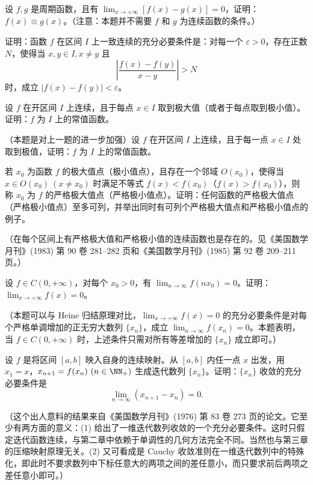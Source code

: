 \begin{xreferenceproblem}[14]
设 $f,g$ 是周期函数，且有 $\lim_{x\to+\infty}[f(x)-g(x)]=0$，证明：$f(x)\equiv g(x)$。（注意：本题并不需要 $f$ 和 $g$ 为连续函数的条件。）
\end{xreferenceproblem}

\begin{xreferenceproblem}[15]
证明：函数 $f$ 在区间 $I$ 上一致连续的充分必要条件是：对每一个 $\varepsilon>0$，存在正数 $N$，使得当 $x,y\in I,x\ne y$ 且
  \[
    \left|\frac{f(x)-f(y)}{x-y}\right|>N
  \]
  时，成立 $|f(x)-f(y)|<\varepsilon$。
\end{xreferenceproblem}

\begin{xreferenceproblem}[16]
设 $f$ 在开区间 $I$ 上连续，且于每点 $x\in I$ 取到极大值（或者于每点取到极小值）。证明：$f$ 为 $I$ 上的常值函数。
\end{xreferenceproblem}

\begin{xreferenceproblem}[17]
（本题是对上一题的进一步加强）设 $f$ 在开区间 $I$ 上连续，且于每一点 $x\in I$ 处取到极值，证明：$f$ 为 $I$ 上的常值函数。
\end{xreferenceproblem}

\begin{xreferenceproblem}[18]
若 $x_0$ 为函数 $f$ 的极大值点（极小值点），且存在一个邻域 $O(x_0)$，使得当 $x\in O(x_0)\ (x\ne x_0)$ 时满足不等式 $f(x)<f(x_0)$（$f(x)>f(x_0)$），则称 $x_0$ 为 $f$ 的严格极大值点（严格极小值点）。证明：任何函数的严格极大值点（严格极小值点）至多可列，并举出同时有可列个严格极大值点和严格极小值点的例子。

  （在每个区间上有严格极大值和严格极小值的连续函数也是存在的。见《美国数学月刊》(1983) 第 90 卷 281--282 页和《美国数学月刊》(1985) 第 92 卷 209--211 页。）
\end{xreferenceproblem}

\begin{xreferenceproblem}[19]
设 $f\in C(0,+\infty)$，对每个 $x_0>0$，有 $\lim_{n\to\infty}f(nx_0)=0$。证明：$\lim_{x\to+\infty}f(x)=0$。

  （本题可以与 Heine 归结原理对比，$\lim_{x\to+\infty}f(x)=0$ 的充分必要条件是对每个严格单调增加的正无穷大数列 $\{x_n\}$，成立 $\lim_{n\to\infty}f(x_n)=0$。本题表明，当 $f\in C(0,+\infty)$ 时，上述条件只需对所有等差增加的 $\{x_n\}$ 成立即可。）
\end{xreferenceproblem}

\begin{xreferenceproblem}[20]
设 $f$ 是将区间 $[a,b]$ 映入自身的连续映射。从 $[a,b]$ 内任一点 $x$ 出发，用 $x_1=x$，$x_{n+1}=f(x_n)\ (n\in\NN_+)$ 生成迭代数列 $\{x_n\}$。证明：$\{x_n\}$ 收敛的充分必要条件是
  \[
    \lim_{n\to\infty}(x_{n+1}-x_n)=0.
  \]

  （这个出人意料的结果来自《美国数学月刊》(1976) 第 83 卷 273 页的论文。它至少有两方面的意义：(1) 给出了一维迭代数列收敛的一个充分必要条件。这时只假定迭代函数连续，与第二章中依赖于单调性的几何方法完全不同。当然也与第三章的压缩映射原理无关。(2) 又可看成是 Cauchy 收敛准则在一维迭代数列中的特殊化，即此时不要求数列中下标任意大的两项之间的差任意小，而只要求前后两项之差任意小即可。）
\end{xreferenceproblem}

